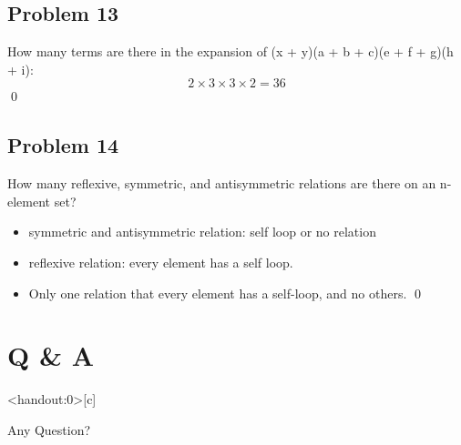 \documentclass[
               handout,
               ]{beamer}
\begin{document}
    \subsection{Problem 13}
    
        \begin{frame}[c]{\subsecname}
            How many terms are there in the expansion of (x + y)(a + b + c)(e + f + g)(h + i):\\$\;$\\\pause
            \[2\times3\times3\times2=36\] \qed
        \end{frame}



    \subsection{Problem 14}
    
        \begin{frame}[c]{\subsecname}
            How many reflexive, symmetric, and antisymmetric relations are there on an n-element set?\\$\;$\\\pause
            \begin{itemize}
            \item symmetric and antisymmetric relation: self loop or no relation
            \item reflexive relation: every element has a self loop.
            \item Only one relation that every element has a self-loop, and no others. \qed
            \end{itemize}
        \end{frame}
        
        
        
\section*{Q \& A}

    \begin{frame}<handout:0>[c]{\secname}
        \centerline{\Large{Any Question?}}
    \end{frame}
    
    
    
\end{document}
